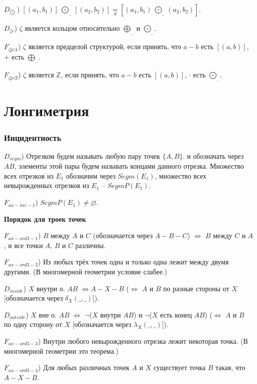 \documentclass[a4paper]{article}
\begin{document}
$D_{\underline{\bigodot}}$)  $[(a_1, b_1)] \: \underline{\bigodot} \: [(a_2, b_2)] \underset{d}{=} [(a_1, b_1) \: \underline{\bigodot} \: (a_2, b_2)].$

$D_{\zeta r}$) $\zeta$ является кольцом относительно $\underline{\bigoplus}$ и $\underline{\bigodot}$.

$F_{\zeta p z1}$) $\zeta$ является предцелой структурой, если принять, что $a-b$ есть $[(a, b)]$, $+$ есть $\underline{\bigoplus}$.

$F_{\zeta p z2}$) $\zeta$ является $\mathbb{Z}$, если принять, что $a-b$ есть $[(a, b)]$, $\cdot$ есть $\underline{\bigodot}$.

\clearpage


\part{Лонгиметрия}

\section{Инцидентность}

$D_{segm}$) Отрезком будем называть любую пару точек $\{A, B\}$. и обозначать через $AB$, элементы этой пары будем называть концами данного отрезка. Множество всех отрезков из $E_1$ обозначим через $Segm(E_1)$, множество всех невырожденных отрезков из $E_1$ -- $SegmP(E_1)$.

$F_{ax-inc-1}$) $SegmP(E_1) \neq \varnothing$.

\textbf{Порядок для троек точек}

$F_{ax-ord3-1}$) $B$ между $A$ и $C$ (обозначается через $A-B-C$) $\Leftrightarrow$ $B$ между $C$ и $A$, и все точки $A$, $B$ и $C$ различны.

$F_{ax-ord3-2}$) Из любых трёх точек одна и только одна лежит между двумя другими. (В многомерной геометрии условие слабее.)

$D_{inside}$) $X$ внутри о. $AB$ $\Leftrightarrow A-X-B$ ($\Leftrightarrow$ $A$ и $B$ по разные стороны от $X$ [обозначается через $\delta_X(\_,\_)$]).

$D_{outside}$) $X$ вне о. $AB$ $\Leftrightarrow$ $\neg$($X$ внутри $AB$) и $\neg$($X$ есть конец $AB$) ($\Leftrightarrow$ $A$ и $B$ по одну сторону от $X$ [обозначается через $\lambda_X(\_,\_)$]).

$F_{ax-ord3-3}$) Внутри любого невырожденного отрезка лежит некоторая точка. (В многомерной геометрии это теорема.)

$F_{ax-ord3-4}$) Для любых различных точек $A$ и $X$ существует точка $B$ такая, что $A-X-B$.
\end{document}
